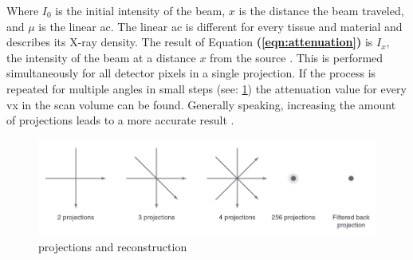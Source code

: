 \noindent
Where $I_{0}$ is the initial intensity of the beam, $x$ is the distance the beam traveled, and $\mu$ is the linear \acrlong{ac}.
The linear \acrfull{ac} is different for every tissue and material and describes its X-ray density.
The result of Equation \textbf{(\ref{eqn:attenuation})} is $I_{x}$, the intensity of the beam at a distance $x$ from the source \cite{liMicrocomputedTomographySmall2008,orhanMicrocomputedTomographyMicroCT2020}.
This is performed simultaneously for all detector pixels in a single projection.
If the process is repeated for multiple angles in small steps (see: \cref{fig:ct-projections}) the attenuation value for every \gls{vx} in the scan volume can be found.
Generally speaking, increasing the amount of projections leads to a more accurate result \cite{liMicrocomputedTomographySmall2008,orhanMicrocomputedTomographyMicroCT2020}.
\begin{figure}[h]
	\centerline{
		\includegraphics[scale=0.5]{images/ct-projections.png}}
	\caption{\mct\space projections and reconstruction \cite{orhanMicrocomputedTomographyMicroCT2020}}\label{fig:ct-projections}
\end{figure}


